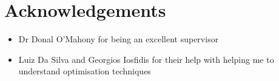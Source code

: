 \chapter*{Acknowledgements}

\begin{itemize}
  \item Dr Donal O'Mahony for being an excellent supervisor
  \item Luiz Da Silva and Georgios Iosfidis for their help with helping me to understand
optimisation techniques
\end{itemize}